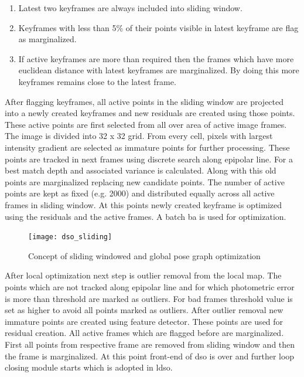 \begin{enumerate}
	\item Latest two keyframes are always included into sliding window.
	\item Keyframes with less than 5\% of their points visible in latest keyframe are flag as marginalized.  
	\item If active keyframes are more than required then the frames which have more euclidean distance with latest keyframes are marginalized. By doing this more keyframes remains close to the latest frame. 
\end{enumerate}
After flagging keyframes, all active points in the sliding window are projected into a newly created keyframes and new residuals are created using those points. These active points are first selected from all over area of active image frames. The image is divided into 32 x 32 grid.
From every cell, pixels with largest intensity gradient are selected as immature points for further processing. These points are tracked in next frames using discrete search along epipolar line. For a best match depth and associated variance is calculated. Along with this old points are marginalized replacing new candidate points. The number of active points are kept as fixed (e.g. 2000) and distributed equally across all active frames in sliding window. At this points newly created keyframe is optimized using the residuals and the active frames. A batch \acrshort{ba} is used for optimization.  
\begin{figure}[h!]
	\centering
	\texttt{[image: dso\_sliding]}
	\caption{Concept of sliding windowed and global pose graph optimization \cite{gao2018ldso}}
	\label{fig:dso_sliding}
\end{figure}
After local optimization next step is outlier removal from the local map. The points which are not tracked along epipolar line and for which photometric error is more than threshold are marked as outliers. For bad frames threshold value is set as higher to avoid all points marked as outliers. After outlier removal new immature points are created using feature detector. These points are used for residual creation. All active frames which are flagged before are marginalized. First all points from respective frame are removed from sliding window and then the frame is marginalized. At this point front-end of \acrshort{dso} is over and further loop closing module starts which is adopted in \acrshort{ldso}.

